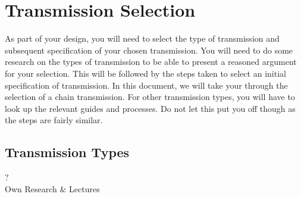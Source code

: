 \section{Transmission Selection}

As part of your design, you will need to select the type of transmission and subsequent specification of your chosen transmission. You will need to do some research on the types of transmission to be able to present a reasoned argument for your selection. This will be followed by the steps taken to select an initial specification of transmission. In this document, we will take your through the selection of a chain transmission. For other transmission types, you will have to look up the relevant guides and processes. Do not let this put you off though as the steps are fairly similar.

\subsection{Transmission Types}

\begin{framed}
  \vspace{1cm}
    \begin{center}
      {\fontsize{50}{60}\selectfont ?}\\
      Own Research \& Lectures
    \end{center}
  \vspace{1cm}
\end{framed}






